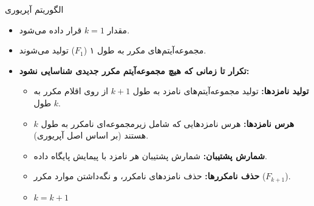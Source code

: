 \begin{frame}{الگوریتم آپریوری}{}
\begin{itemize}\setlength{\itemsep}{7pt}
    \item مقدار $k=1$ قرار داده می‌شود.
    \item مجموعه‌آیتم‌های مکرر به طول ۱ ($F_1$) تولید می‌شوند.
    \item \textbf{تکرار تا زمانی که هیچ مجموعه‌آیتم مکرر جدیدی شناسایی نشود:}
    \begin{itemize}\setlength{\itemsep}{4pt}
        \item \textbf{تولید نامزدها:} تولید مجموعه‌آیتم‌های نامزد به طول $k+1$ از روی اقلام مکرر به طول $k$.
        \item \textbf{هرس نامزدها:} هرس نامزدهایی که شامل زیرمجموعه‌ای نامکرر به طول $k$ هستند (بر اساس اصل آپریوری).
        \item \textbf{شمارش پشتیبان:} شمارش پشتیبان هر نامزد با پیمایش پایگاه داده.
        \item \textbf{حذف نامکررها:} حذف نامزدهای نامکرر، و نگه‌داشتن موارد مکرر ($F_{k+1}$).
        \item $k = k + 1$
    \end{itemize}
\end{itemize}
\end{frame}

